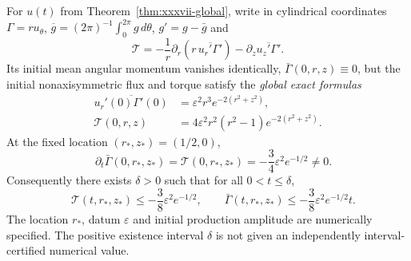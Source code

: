 \begin{theorem}
\label{thm:xxxvii-exact-production}
For $u(t)$ from Theorem~\ref{thm:xxxvii-global},
write in cylindrical coordinates $\Gamma=ru_\theta$,
$\overline{g}=(2\pi)^{-1}\int_0^{2\pi}g\,d\theta$,
$g'=g-\bar g$ and
\[
\mathcal T=
-\frac1r\partial_r
(r\,\overline{u_r'\Gamma'})
-\partial_z\overline{u_z'\Gamma'}.
\]
Its initial mean angular momentum vanishes identically,
$\bar\Gamma(0,r,z)\equiv0$, but the initial
nonaxisymmetric flux and torque satisfy the
\emph{global exact formulas}
\begin{align}
\overline{u_r'(0)\Gamma'(0)}
&=\varepsilon^2r^3e^{-2(r^2+z^2)},\\
\mathcal T(0,r,z)
&=4\varepsilon^2r^2(r^2-1)e^{-2(r^2+z^2)}.
\label{eq:xxxvii-exact-torque}
\end{align}
At the fixed location $(r_*,z_*)=(1/2,0)$,
\begin{equation}\label{eq:xxxvii-positive-production}
\boxed{\quad
\partial_t\bar\Gamma(0,r_*,z_*)
=\mathcal T(0,r_*,z_*)
=-\frac34\varepsilon^2e^{-1/2}\ne0.}
\end{equation}
Consequently there exists $\delta>0$ such that
for all $0<t\le\delta$,
\begin{equation}\label{eq:xxxvii-positive-time}
\boxed{\quad
\mathcal T(t,r_*,z_*)\le
-\frac38\varepsilon^2e^{-1/2},\qquad
\bar\Gamma(t,r_*,z_*)\le
-\frac38\varepsilon^2e^{-1/2}t.}
\end{equation}
The location $r_*$, datum $\varepsilon$ and
initial production amplitude are numerically
specified. The positive existence interval $\delta$
is not given an independently interval-certified
numerical value.
\end{theorem}
